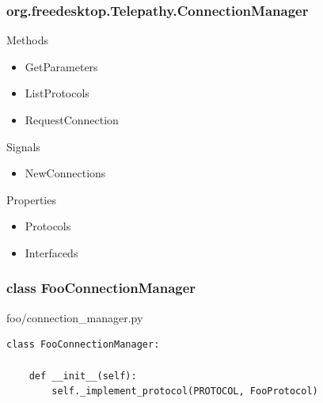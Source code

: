 \documentclass{beamer}
\begin{document}
\begin{frame}[fragile]
    \frametitle{org.freedesktop.Telepathy.ConnectionManager}

    \begin{block}{Methods}
    \begin{itemize}
    \item GetParameters
    \item ListProtocols
    \item RequestConnection
    \end{itemize}
    \end{block}

    \begin{block}{Signals}
    \begin{itemize}
    \item NewConnections
    \end{itemize}
    \end{block}

    \begin{block}{Properties}
    \begin{itemize}
    \item Protocols
    \item Interfaceds
    \end{itemize}
    \end{block}
\end{frame}

\begin{frame}[fragile]
    \frametitle{class FooConnectionManager}
    \begin{block}{foo/connection\_manager.py}
    \begin{verbatim}
class FooConnectionManager:

    def __init__(self):
        self._implement_protocol(PROTOCOL, FooProtocol)
    \end{verbatim}
    \end{block}
\end{frame}
\end{document}
